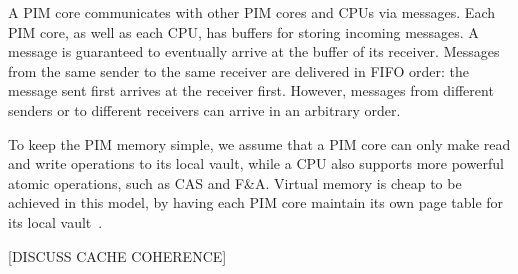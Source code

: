 A PIM core communicates with other PIM cores and CPUs via messages.
Each PIM core, as well as each CPU, has buffers for storing incoming messages.
A message is guaranteed to eventually arrive at the buffer of its receiver.
Messages from the same sender to the same receiver are delivered in FIFO order: 
the message sent first arrives at the receiver first. 
However, messages from different senders or to different receivers can arrive in an arbitrary order. 

To keep the PIM memory simple, we assume that a PIM core can only make read and write operations 
to its local vault, while a CPU also supports more powerful atomic operations, such as CAS and F\&A.
Virtual memory is cheap to be achieved in this model, 
by having each PIM core maintain its own page table for its local vault~\cite{}.

[DISCUSS CACHE COHERENCE]
